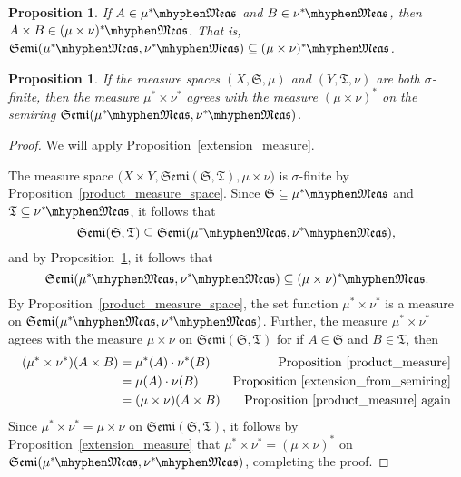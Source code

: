 \documentclass[
twoside=true,
paper=letter,
fontsize=11pt,
pagesize=auto,
leqno,
openany,
headsepline,
overfullrule,
]{scrbook}
\theoremstyle{plain}
\theoremstyle{plain}
\newtheorem{prop}[thm]{Proposition}
\theoremstyle{definition}
\theoremstyle{bfnoteitalic}
\theoremstyle{bfnoteroman}
\newcommand{\sigalg}[1]{\mathfrak{#1}}
\newcommand{\textsigma}{\hbox{\large{$\sigma$}}\kern-1pt}
\newcommand{\semiring}{\sigalg{S}}
\newcommand{\semiringii}{\sigalg{T}}
\newcommand{\productsemiring}[2]{\mathfrak{Semi}(#1,#2)}
\newcommand{\measurable}[1]{{#1}\mhyphen\mathfrak{Meas}}
\newcommand{\kernast}{\ast\kern-1pt}
\newcommand{\measurespace}{X}
\newcommand{\measurespaceii}{Y}
\newcommand{\measure}{\mu}
\newcommand{\measureii}{\nu}
\newcommand{\seti}{A}
\newcommand{\setii}{B}
\begin{document}
\begin{prop}\label{semiring_inclusion}
If
$\seti\in\measurable{\measure^\kernast}$ and 
$\setii\in\measurable{\measureii^\kernast}$, then
$\seti\times\setii \in \measurable{(\measure\times\measureii)^\kernast}$.  
That is,
$\productsemiring{\measurable{\measure^\kernast}}{\measurable{\measureii^\kernast}}
\subseteq
\measurable{(\measure\times\measureii)^\kernast}$.
\end{prop}


\begin{prop}\label{agreeable_product_measures}
If the measure spaces
$(\measurespace, \semiring, \measure)$
and
$(\measurespaceii, \semiringii, \measureii)$ 
are both \textsigma\hyp{}finite, then the measure
$\measure^*\times\measureii^*$ agrees with the measure
$(\measure\times\measureii)^*$ on the semiring
$\productsemiring{\measurable{\measure^\kernast}}{\measurable{\measureii^\kernast}}$.
\end{prop}

\begin{proof}
We will apply Proposition~\ref{extension_measure}.

The measure space  
$\bigl(\measurespace\times\measurespaceii, 
\productsemiring{\semiring}{\semiringii}, 
\measure\times\measureii\bigr)$ is \textsigma\hyp{}finite by Proposition~\ref{product_measure_space}.
Since
$\semiring\subseteq \measurable{\measure^\kernast}$
and
$\semiringii\subseteq \measurable{\measureii^\kernast}$, it follows that
\[
\productsemiring{\semiring}{\semiringii}
\subseteq
\productsemiring{\measurable{\measure^\kernast}}{\measurable{\measureii^\kernast}},
\]
and by Proposition~\ref{semiring_inclusion}, it follows that
\[
\productsemiring{\measurable{\measure^\kernast}}{\measurable{\measureii^\kernast}}
\subseteq
\measurable{(\measure\times\measureii)^\kernast}.
\]
By Proposition~\ref{product_measure_space}, the set function 
$\measure^*\times\measureii^*$
is a measure on 
$\productsemiring{\measurable{\measure^\kernast}}{\measurable{\measureii^\kernast}}$.
Further, the measure 
$\measure^*\times\measureii^*$
agrees with the measure
$\measure\times\measureii$ on 
$\productsemiring{\semiring}{\semiringii}$ for if 
$\seti\in\semiring$ and $\setii\in\semiringii$, then 
\begin{align*}
(\measure^*\times\measureii^*)(\seti\times\setii)
& = \measure^*(\seti)\cdot\measureii^*(\setii)
&\text{Proposition~\ref{product_measure}} 
\\
& = \measure(\seti)\cdot\measureii(\setii)
&\text{Proposition~\ref{extension_from_semiring}}
\\
& =(\measure\times\measureii)(\seti\times\setii)
&\text{Proposition~\ref{product_measure} again}
\\
\end{align*}
Since  
$\measure^*\times\measureii^*
=
\measure\times\measureii$ on 
$\productsemiring{\semiring}{\semiringii}$, 
it follows by Proposition~\ref{extension_measure} that 
$\measure^*\times\measureii^*
=
(\measure\times\measureii)^*$ on
$\productsemiring{\measurable{\measure^\kernast}}{\measurable{\measureii^\kernast}}$,
completing the proof. 
\end{proof}
\end{document}
